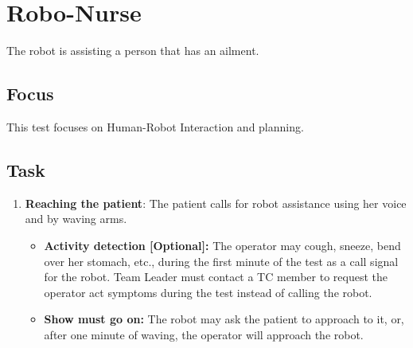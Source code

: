 \section{Robo-Nurse}

The robot is assisting a person that has an ailment. 

\subsection{Focus}

This test focuses on Human-Robot Interaction and planning.

\subsection{Task}
\begin{enumerate}
\item \textbf{Reaching the patient}: The patient calls for robot assistance using her voice and by waving arms.
\begin{itemize}
\item \textbf{Activity detection [Optional]:} The operator may cough, sneeze, bend over her stomach, etc., during the first minute of the test as a call signal for the robot. Team Leader must contact a TC member to request the operator act symptoms during the test instead of calling the robot.
\item \textbf{Show must go on:} The robot may ask the patient to approach to it, or, after one minute of waving, the operator will approach the robot.
\end{itemize}
 

\end{enumerate}
